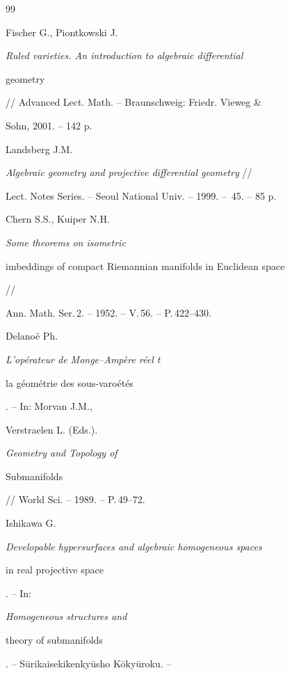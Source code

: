\begin{thebibliography}{99} %







Fischer G., Piontkowski J.


{\em Ruled varieties. An introduction to algebraic differential


geometry} // Advanced Lect. Math. -- Braunschweig: Friedr. Vieweg \&


Sohn, 2001. -- 142 p.










Landsberg J.M.


{\em Algebraic geometry and projective differential geometry} //


Lect. Notes Series. -- Seoul National Univ. -- 1999. -- \No\,45. -- 85 p.







Chern S.S., Kuiper N.H. {\em Some theorems on isometric


imbeddings of compact Riemannian manifolds in Euclidean space} //


Ann. Math. Ser.\,2. -- 1952. -- V.\,56. -- P.\,422--430.







Delano\"{e} Ph. {\em L'op\'{e}rateur de Monge--Amp\`{e}re r\'{e}el t


la g\'{e}om\'{e}trie des sous-varo\'{e}t\'{e}s}. -- In: Morvan J.M.,


Verstraelen L. (Eds.). {\em Geometry and Topology of


Submanifolds} // World Sci. -- 1989. -- P.\,49--72.







Ishikawa G.


{\em Developable hypersurfaces and algebraic homogeneous spaces


in real projective space}. -- In: {\em Homogeneous structures and


theory of submanifolds}. -- S\=urikaisekikenky\=usho K\=oky\=uroku. --



\end{thebibliography}
